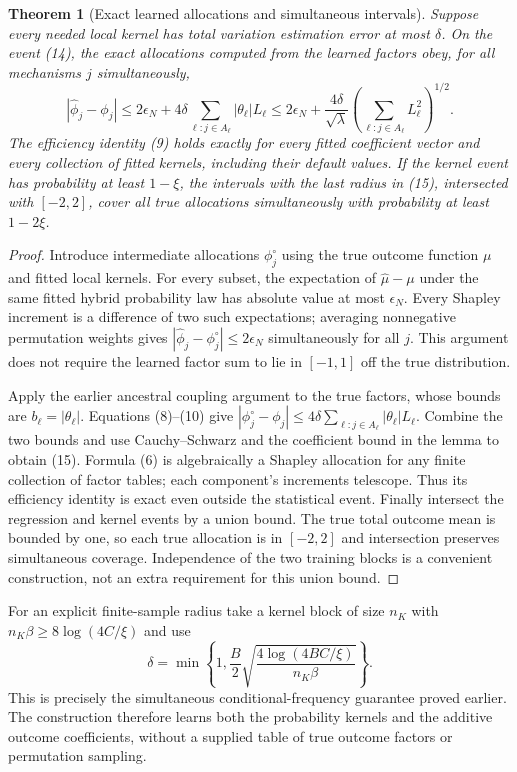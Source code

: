 \documentclass[11pt]{article}
\newtheorem{theorem}{Theorem}
\theoremstyle{definition}
\begin{document}
\begin{theorem}[Exact learned allocations and simultaneous intervals]
Suppose every needed local kernel has total variation estimation error
at most $\delta$. On the event (14), the exact allocations computed
from the learned factors obey, for all mechanisms $j$ simultaneously,
\[
 |\widehat\phi_j-\phi_j|
 \le 2\epsilon_N+
       4\delta\sum_{\ell:j\in A_\ell}|\theta_\ell|L_\ell
 \le 2\epsilon_N+
       \frac{4\delta}{\sqrt\lambda}
          \left(\sum_{\ell:j\in A_\ell}L_\ell^2\right)^{1/2}.
                                                        \tag{15}
\]
The efficiency identity (9) holds exactly for every fitted coefficient
vector and every collection of fitted kernels, including their default
values. If the kernel event has probability at least $1-\xi$, the
intervals with the last radius in (15), intersected with $[-2,2]$,
cover all true allocations simultaneously with probability at least
$1-2\xi$.
\end{theorem}
\begin{proof}
Introduce intermediate allocations $\phi_j^\circ$ using the true
outcome function $\mu$ and fitted local kernels. For every subset,
the expectation of $\widehat\mu-\mu$ under the same fitted hybrid
probability law has absolute value at most $\epsilon_N$.
Every Shapley increment is a difference of two such expectations;
averaging nonnegative permutation weights gives
$|\widehat\phi_j-\phi_j^\circ|\le2\epsilon_N$ simultaneously
for all $j$. This argument does not require the learned factor sum to
lie in $[-1,1]$ off the true distribution.

Apply the earlier ancestral coupling argument to the true factors,
whose bounds are $b_\ell=|\theta_\ell|$. Equations (8)--(10)
give
$|\phi_j^\circ-\phi_j|\le4\delta
\sum_{\ell:j\in A_\ell}|\theta_\ell|L_\ell$.
Combine the two bounds and use Cauchy--Schwarz and the coefficient bound
in the lemma to obtain (15). Formula (6) is algebraically a Shapley
allocation for any finite collection of factor tables; each component's
increments telescope. Thus its efficiency identity is exact even outside
the statistical event. Finally intersect the regression and kernel
events by a union bound. The true total outcome mean is bounded by one,
so each true allocation is in $[-2,2]$ and intersection preserves
simultaneous coverage. Independence of the two training blocks is a
convenient construction, not an extra requirement for this union bound.
\end{proof}

For an explicit finite-sample radius take a kernel block of size $n_K$
with $n_K\beta\ge8\log(4C/\xi)$ and use
\[
 \delta=\min\left\{1,\frac B2
          \sqrt{\frac{4\log(4BC/\xi)}{n_K\beta}}\right\}.
\]
This is precisely the simultaneous conditional-frequency guarantee
proved earlier. The construction therefore learns both the probability
kernels and the additive outcome coefficients, without a supplied table
of true outcome factors or permutation sampling.
\end{document}
